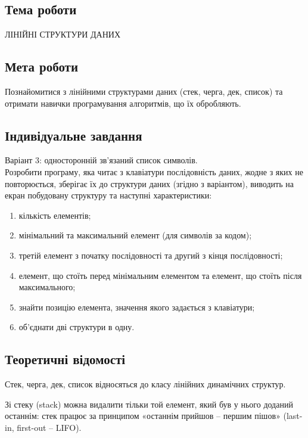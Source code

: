\documentclass[12pt]{extarticle}
\begin{document}
\subsection*{Тема роботи} 
ЛІНІЙНІ СТРУКТУРИ ДАНИХ



\subsection*{Мета роботи} Познайомитися з лінійними структурами даних (стек, черга, дек, список) та отримати навички програмування алгоритмів, що їх обробляють.

\subsection*{Індивідуальне завдання}
Варіант 3: односторонній зв’язаний список символів.\\ 

Розробити програму, яка читає з клавіатури послідовність даних, жодне з яких не повторюється, зберігає їх до структури даних (згідно з варіантом), виводить на екран побудовану структуру та наступні характеристики:
\begin{enumerate}
\item       кількість елементів;

\item       мінімальний та максимальний елемент (для символів за кодом);

\item       третій елемент з початку послідовності та другий з кінця послідовності;

\item       елемент, що стоїть перед мінімальним елементом та елемент, що стоїть після максимального;

\item       знайти позицію елемента, значення якого задається з клавіатури;

\item       об'єднати дві структури в одну.
\end{enumerate}

\subsection*{Теоретичні відомості}
Стек, черга, дек, список відносяться до класу лінійних динамічних структур.

 Зі стеку (stack) можна видалити тільки той елемент, який був у нього доданий останнім: стек працює за принципом «останнім прийшов – першим пішов» (last-in, first-out – LIFO).
\end{document}
